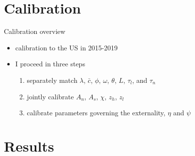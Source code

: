 \documentclass[11pt,aspectratio=169]{beamer}
\begin{document}
\section{Calibration}
	\begin{frame}{Calibration overview}
	\begin{itemize}
		\item<+-> calibration to the US in 2015-2019
		\item<+-> I proceed in three steps
		\vspace{4mm}
		\begin{enumerate}[<+-| alert@+>] %
			\item separately match $\lambda$, $\bar{c}$, $\phi$, $\omega$, $\theta$, $L$, $\tau_l$, and $\tau_n$
			\vspace{2mm}
			\item jointly calibrate $A_n$, $A_s$, $\chi$, $z_h$, $z_l$%
			\vspace{2mm}
			\item calibrate parameters governing the externality, $\eta$ and $\psi$
		\end{enumerate}
	\end{itemize}
\end{frame}
\hypertarget{resback}{}
\section{Results}
\end{document}
